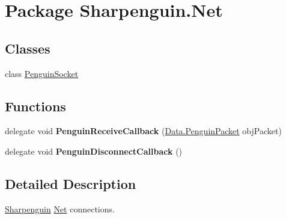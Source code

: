 \hypertarget{namespaceSharpenguin_1_1Net}{\section{Package Sharpenguin.\-Net}
\label{namespaceSharpenguin_1_1Net}
}
\subsection*{Classes}
\begin{DoxyCompactItemize}
\item 
class \hyperlink{classSharpenguin_1_1Net_1_1PenguinSocket}{Penguin\-Socket}
\end{DoxyCompactItemize}
\subsection*{Functions}
\begin{DoxyCompactItemize}
\item 
\hypertarget{namespaceSharpenguin_1_1Net_a9dd0c23bfe5647606a87eca32341b17b}{delegate void {\bfseries Penguin\-Receive\-Callback} (\hyperlink{classSharpenguin_1_1Data_1_1PenguinPacket}{Data.\-Penguin\-Packet} obj\-Packet)}\label{namespaceSharpenguin_1_1Net_a9dd0c23bfe5647606a87eca32341b17b}

\item 
\hypertarget{namespaceSharpenguin_1_1Net_a2a00d3d8b50911f340b3126504587edc}{delegate void {\bfseries Penguin\-Disconnect\-Callback} ()}\label{namespaceSharpenguin_1_1Net_a2a00d3d8b50911f340b3126504587edc}

\end{DoxyCompactItemize}


\subsection{Detailed Description}
\hyperlink{namespaceSharpenguin}{Sharpenguin} \hyperlink{namespaceSharpenguin_1_1Net}{Net} connections. 